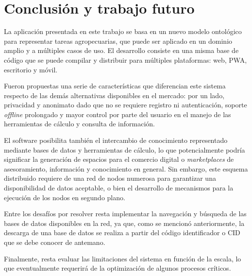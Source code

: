 \section{Conclusión y trabajo futuro} \label{sec:conclusion}

La aplicación presentada en este trabajo se basa en un nuevo modelo ontológico para representar tareas agropecuarias, que puede ser aplicado en un dominio amplio y a múltiples casos de uso. El desarrollo consiste en una misma base de código que se puede compilar y distribuir para múltiples plataformas: web, PWA, escritorio y móvil.

Fueron propuestas una serie de características que diferencian este sistema respecto de las demás alternativas disponibles en el mercado: por un lado, privacidad y anonimato dado que no se requiere registro ni autenticación, soporte \textit{offline} prolongado y mayor control por parte del usuario en el manejo de las herramientas de cálculo y consulta de información.

El software posibilita también el intercambio de conocimiento representado mediante bases de datos y herramientas de cálculo, lo que potencialmente podría significar la generación de espacios para el comercio digital o \textit{marketplaces} de asesoramiento, información y conocimiento en general. Sin embargo, este esquema distribuido requiere de una red de nodos numerosa para garantizar una disponibilidad de datos aceptable, o bien el desarrollo de mecanismos para la ejecución de los nodos en segundo plano.

Entre los desafíos por resolver resta implementar la navegación y búsqueda de las bases de datos disponibles en la red, ya que, como se mencionó anteriormente, la descarga de una base de datos se realiza a partir del código identificador o CID que se debe conocer de antemano.

Finalmente, resta evaluar las limitaciones del sistema en función de la escala, lo que eventualmente requerirá de la optimización de algunos procesos críticos.
